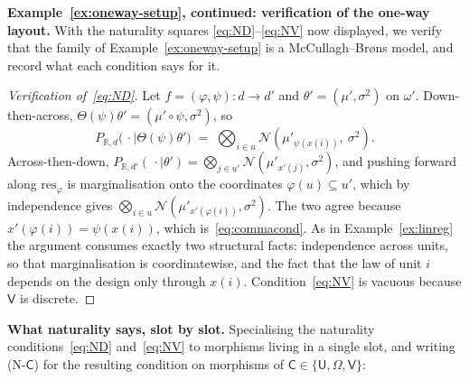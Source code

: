 \documentclass[11pt,a4paper]{article}
\theoremstyle{plain}
\theoremstyle{definition}
\theoremstyle{remark}
\newcommand{\cat}[1]{\mathsf{#1}}
\newcommand{\catU}{\cat{U}}
\newcommand{\catV}{\cat{V}}
\newcommand{\catO}{\cat{\Omega}}
\newcommand{\R}{\mathbb{R}}
\newcommand{\Norm}{\mathcal{N}}
\newcommand{\res}{\mathrm{res}}
\begin{document}
\medskip
\noindent\textbf{Example~\ref{ex:oneway-setup}, continued: verification of the
one-way layout.} With the naturality squares \eqref{eq:ND}--\eqref{eq:NV} now
displayed, we verify that the family of Example~\ref{ex:oneway-setup} is a
McCullagh--Br\o ns model, and record what each condition says for it.

\begin{proof}[Verification of~\eqref{eq:ND}]
Let $f = (\varphi,\psi) \colon d \to d'$ and $\theta' = (\mu',\sigma^{2})$ on
$\omega'$. Down-then-across, $\Theta(\psi)\theta' = (\mu' \circ
\psi,\sigma^{2})$, so
\[
P_{\R,d}\bigl(\,\cdot \mid \Theta(\psi)\theta'\bigr)
\;=\; \bigotimes_{i \in u} \Norm(\mu'_{\psi(x(i))},\ \sigma^{2}).
\]
Across-then-down, $P_{\R,d'}(\,\cdot \mid \theta') = \bigotimes_{j \in u'}
\Norm(\mu'_{x'(j)},\sigma^{2})$, and pushing forward along $\res_{\varphi}$ is
marginalisation onto the coordinates $\varphi(u) \subseteq u'$, which by
independence gives $\bigotimes_{i \in u}
\Norm(\mu'_{x'(\varphi(i))},\sigma^{2})$. The two agree because
$x'(\varphi(i)) = \psi(x(i))$, which is~\eqref{eq:commacond}. As in
Example~\ref{ex:linreg} the argument consumes exactly two structural facts:
independence across units, so that marginalisation is coordinatewise, and the
fact that the law of unit $i$ depends on the design only through $x(i)$.
Condition~\eqref{eq:NV} is vacuous because $\catV$ is discrete.
\end{proof}

\noindent\textbf{What naturality says, slot by slot.} Specialising the
naturality conditions~\eqref{eq:ND} and~\eqref{eq:NV} to morphisms living in
a single slot, and writing (N-$\cat{C}$) for the resulting condition on
morphisms of $\cat{C} \in \{\catU,\catO,\catV\}$:
\end{document}
